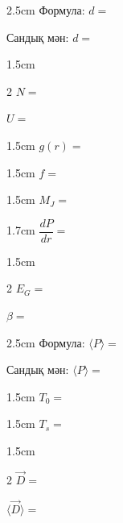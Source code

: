 
\begin{answerbox}{2.5cm}
Формула: \(d=\)

\bigskip

Сандық мән: \(d=\)
\end{answerbox}

\begin{answerbox}{1.5cm}
\begin{multicols}{2}
\(N=\)

\columnbreak

\(U=\)
\end{multicols}
\end{answerbox}

\begin{answerbox}{1.5cm}
\(g(r)=\)
\end{answerbox}

\begin{answerbox}{1.5cm}
\(f=\)
\end{answerbox}

\begin{answerbox}{1.5cm}
\(M_J=\)
\end{answerbox}

\begin{answerbox}{1.7cm}
\(\dfrac{dP}{dr}=\)
\end{answerbox}

\begin{answerbox}{1.5cm}
\begin{multicols}{2}
\(E_G=\)

\columnbreak

\(\beta=\)
\end{multicols}
\end{answerbox}

\begin{answerbox}{2.5cm}
Формула: \(\langle P\rangle=\)

\bigskip

Сандық мән: \(\langle P\rangle=\)
\end{answerbox}

\begin{answerbox}{1.5cm}
\(T_0=\)
\end{answerbox}

\begin{answerbox}{1.5cm}
\(T_s=\)
\end{answerbox}

\begin{answerbox}{1.5cm}
\begin{multicols}{2}
\(\vec D=\)

\columnbreak

\(\langle\vec D\rangle=\)
\end{multicols}
\end{answerbox}

